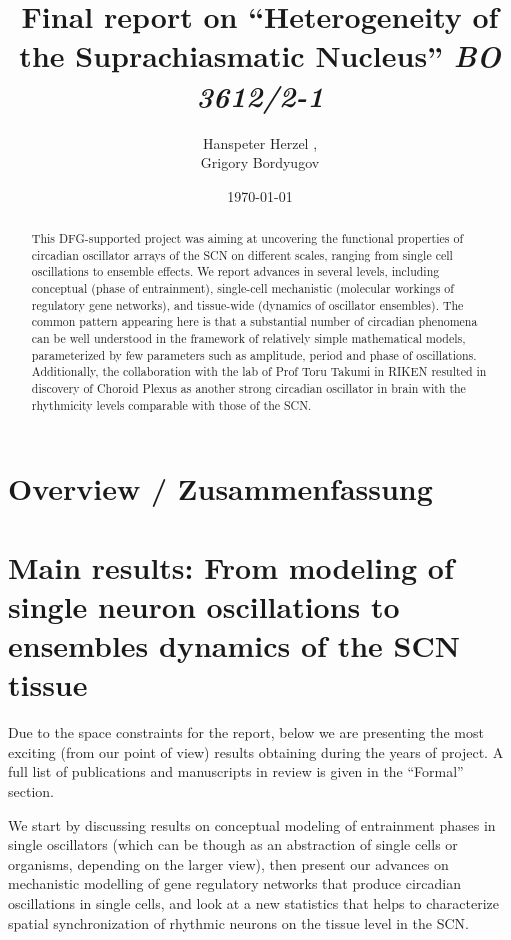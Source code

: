 \documentclass[a4paper]{article}
\title{Final report on ``Heterogeneity of the Suprachiasmatic
Nucleus'' {\em BO 3612/2-1}}
\author{Hanspeter Herzel  \mailhref{h.herzel@biologie.hu-berlin.de},\\
        Grigory Bordyugov \mailhref{grigory.bordyugov@gmail.com}}
\date{\today}
\begin{document}
\maketitle

\thispagestyle{empty}

\begin{abstract}
  This DFG-supported project was aiming at uncovering the functional
  properties of circadian oscillator arrays of the SCN on different
  scales, ranging from single cell oscillations to ensemble effects.
  We report advances in several levels, including conceptual (phase of
  entrainment), single-cell mechanistic (molecular workings of
  regulatory gene networks), and tissue-wide (dynamics of oscillator
  ensembles). The common pattern appearing here is that a substantial
  number of circadian phenomena can be well understood in the
  framework of relatively simple mathematical models, parameterized by
  few parameters such as amplitude, period and phase of oscillations.
  Additionally, the collaboration with the lab of Prof Toru Takumi in
  RIKEN resulted in discovery of Choroid Plexus as another strong
  circadian oscillator in brain with the rhythmicity levels comparable
  with those of the SCN.
\end{abstract}


\newpage

\section{Overview / Zusammenfassung}


\newpage

\section{Main results: From modeling of single neuron oscillations to
ensembles dynamics of the SCN tissue}
Due to the space constraints for the report, below we are presenting
the most exciting (from our point of view) results obtaining during
the years of project. A full list of publications and manuscripts in
review is given in the ``Formal'' section.

We start by discussing results on conceptual modeling of entrainment
phases in single oscillators (which can be though as an abstraction of
single cells or organisms, depending on the larger view), then present
our advances on mechanistic modelling of gene regulatory networks that
produce circadian oscillations in single cells, and look at a new
statistics that helps to characterize spatial synchronization of
rhythmic neurons on the tissue level in the SCN.
\end{document}
